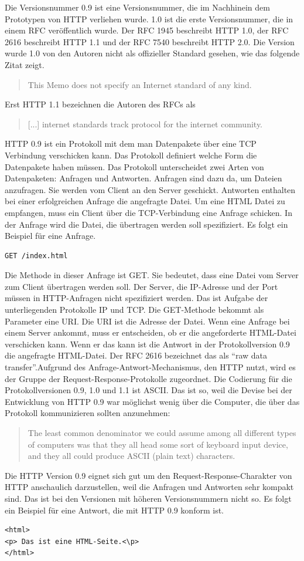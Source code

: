\documentclass{llncs}
\begin{document}
Die Versionsnummer 0.9 ist eine Versionsnummer, die im Nachhinein dem Prototypen von HTTP verliehen wurde. 1.0 ist die erste Versionsnummer, die in einem RFC veröffentlich wurde. Der RFC 1945 beschreibt HTTP 1.0, der RFC 2616 beschreibt HTTP 1.1 und der RFC 7540 beschreibt HTTP 2.0.
Die Version wurde 1.0 von den Autoren nicht als offizieller Standard gesehen, wie das folgende Zitat zeigt. \begin{quote} This Memo does not specify an Internet standard of any kind. \cite{Berners-Lee1996} \end{quote} Erst HTTP 1.1 bezeichnen die Autoren des RFCs als \begin{quote}[...] internet standards track protocol for the internet community. \cite{Fielding1999} \end{quote} HTTP 0.9 ist ein Protokoll mit dem man Datenpakete über eine TCP Verbindung verschicken kann. Das Protokoll definiert welche Form die Datenpakete haben müssen. Das Protokoll unterscheidet zwei Arten von Datenpaketen: Anfragen und Antworten. Anfragen sind dazu da, um Dateien anzufragen. Sie werden vom Client an den Server geschickt. Antworten enthalten bei einer erfolgreichen Anfrage die angefragte Datei. Um eine HTML Datei zu empfangen, muss ein Client über die TCP-Verbindung eine Anfrage schicken. In der Anfrage wird die Datei, die übertragen werden soll spezifiziert. Es folgt ein Beispiel für eine Anfrage.
\begin{verbatim}
GET /index.html
\end{verbatim}
Die Methode in dieser Anfrage ist GET. Sie bedeutet, dass eine Datei vom Server zum Client übertragen werden soll. Der Server, die IP-Adresse und der Port müssen in HTTP-Anfragen nicht spezifiziert werden. Das ist Aufgabe der unterliegenden Protokolle IP und TCP. Die GET-Methode bekommt als Parameter eine URI. Die URI ist die Adresse der Datei.\newline
Wenn eine Anfrage bei einem Server ankommt, muss er entscheiden, ob er die angeforderte HTML-Datei verschicken kann. Wenn er das kann ist die Antwort in der Protokollversion 0.9 die angefragte HTML-Datei. Der RFC 2616 bezeichnet das als ``raw data transfer''.\newline Aufgrund des Anfrage-Antwort-Mechanismus, den HTTP nutzt, wird es der Gruppe der Request-Response-Protokolle zugeordnet. Die Codierung für die Protokollversionen 0.9, 1.0 und 1.1 ist ASCII. Das ist so, weil die Devise bei der Entwicklung von HTTP 0.9 war möglichst wenig über die Computer, die über das Protokoll kommunizieren sollten anzunehmen: \begin{quote} The least common denominator we could assume among all different types of computers was that they all head some sort of keyboard input device, and they all could produce ASCII (plain text) characters. \cite{Berners-Lee1999} \end{quote} Die HTTP Version 0.9 eignet sich gut um den Request-Response-Charakter von HTTP anschaulich darzustellen, weil die Anfragen und Antworten sehr kompakt sind. Das ist bei den Versionen mit höheren Versionsnummern nicht so. Es folgt ein Beispiel für eine Antwort, die mit HTTP 0.9 konform ist.
\begin{verbatim}
<html>
<p> Das ist eine HTML-Seite.<\p>
</html>
\end{verbatim}
\end{document}
